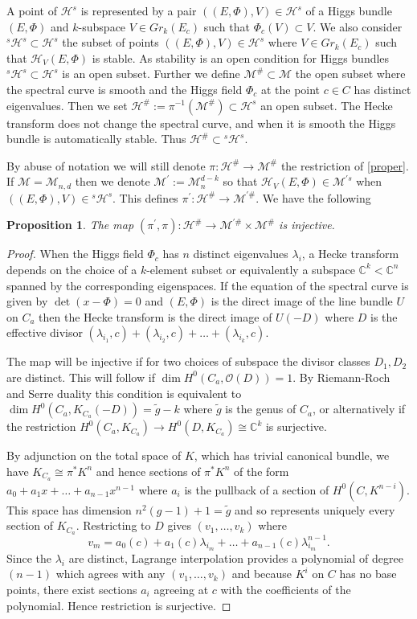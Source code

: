 \documentclass[12pt]{article}
\numberwithin{equation}{section}
\newtheorem{proposition}[theorem]{Proposition}
\theoremstyle{remark}
\theoremstyle{definition}
\numberwithin{theorem}{section}
\def\C{\mathbb{C}}
\def\M{{\mathcal{M}}}
\def\calH{\mathcal{H}}
\renewcommand{\1}{\mathbbm{1}}
\begin{document}
A point of $\calH^s$ is represented by a pair $((E,\Phi),V) \in \calH^s$  of a Higgs bundle $(E,\Phi)$ and $k$-subspace $V\in Gr_k(E_{c})$ such that $\Phi_c(V)\subset V$.   We also consider ${}^{s}\calH^s\subset \calH^s$ the subset of points $((E,\Phi),V)\in \calH^s$ where $V\in Gr_k(E_{c})$ such that $\calH_{V}(E,\Phi)$ is stable. As stability is an open condition for Higgs bundles ${}^{s}\calH^s\subset \calH^s$ is an open subset. Further we define $\M^\#\subset\M$ the open subset where the spectral curve is smooth and the Higgs field $\Phi_c$ at the point $c\in C$ has distinct eigenvalues. Then we set $\calH^\#:=\pi^{-1}(\M^\#)\subset \calH^{s}$ an open subset.  The Hecke transform does not change the spectral curve, and when it is smooth the Higgs bundle is automatically stable. Thus $\calH^\#\subset {}^{s}\calH^s$. 

By abuse of notation we will still denote $\pi:\calH^\# \to \M^\#$ the restriction of \eqref{proper}. If  $\M=\M_{n,d}$ then we denote $\M^\prime:=\M_{n}^{d-k}$ so that $\calH_V(E,\Phi)\in \M^{\prime s}$ when $((E,\Phi),V)\in {}^{s}\calH^s$.  This defines $\pi^\prime:\calH^\#\to \M^{\prime\#}$.  We have the following
\begin{proposition}\label{heckeinjective} The map
	$(\pi^\prime,\pi):\calH^\#\to \M^{\prime \#}\times  \M^\#$ is injective. 
\end{proposition}
\begin{proof}
	When the Higgs field $\Phi_c$ has $n$ distinct eigenvalues $\lambda_i$, a Hecke transform depends on the choice of  a $k$-element subset  or equivalently a subspace $\C^k< \C^n$ spanned by the corresponding eigenspaces.  If the equation of the spectral curve is given by $\det (x-\Phi)=0$ and $(E,\Phi)$ is the direct image of the line bundle $U$ on $C_a$ then the Hecke transform is the direct image of $U(-D)$  where $D$ is the effective divisor $(\lambda_{i_1},c)+(\lambda_{i_2},c)+\dots +(\lambda_{i_k},c)$.
	
	The map will be injective if for two choices  of subspace the divisor classes $D_1,D_2$ are distinct. This will follow if $\dim H^0(C_a, {\mathcal O}(D))=1$.
	By Riemann-Roch and Serre duality this condition is equivalent to $\dim H^0( C_a, K_{C_a}(-D))=\tilde g-k$ where $\tilde g$ is the genus of $ C_a$, or alternatively if  the restriction $H^0(C_a, K_{ C_a})\rightarrow H^0(D, K_{ C_a})\cong \C^k$ is surjective. 
	
	By adjunction on the total space of $K$, which has trivial canonical bundle, we have $K_{ C_a} \cong \pi^*K^n$ and hence sections of $\pi^*K^n$ of the form $a_0+a_1x+\dots +a_{n-1}x^{n-1}$ where $a_i$ is the pullback of a section of $H^0(C,K^{n-i})$. This space has dimension $n^2(g-1)+1=\tilde g$ and so represents uniquely  every section of $K_{ C_a}$. Restricting to $D$ gives $(v_1,\dots, v_k)$ where 
	$$v_m=a_0(c)+a_1(c)\lambda_{i_m}+\dots +a_{n-1}(c)\lambda_{i_m}^{n-1}.$$
	Since the $\lambda_i$ are distinct, Lagrange interpolation provides a polynomial of degree $(n-1)$ which agrees with any $(v_1,\dots, v_k)$ and because $K^i$ on $C$ has no base points, there exist sections $a_i$ agreeing at $c$ with the coefficients of the polynomial. Hence restriction is surjective.
\end{proof} 
\end{document}
